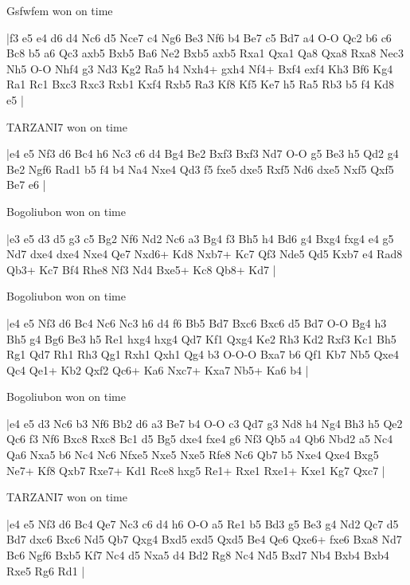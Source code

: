 \showboard

Gsfwfem won on time

\makegametitle
|f3 e5 e4 d6 d4 Nc6 d5 Nce7 c4 Ng6 Be3 Nf6 b4 Be7 c5 Bd7 a4 O-O Qc2 b6 c6 Bc8 b5 a6 Qc3 axb5 Bxb5 Ba6 Ne2 Bxb5 axb5 Rxa1 Qxa1 Qa8 Qxa8 Rxa8 Nec3 Nh5 O-O Nhf4 g3 Nd3 Kg2 Ra5 h4 Nxh4+ gxh4 Nf4+ Bxf4 exf4 Kh3 Bf6 Kg4 Ra1 Rc1 Bxc3 Rxc3 Rxb1 Kxf4 Rxb5 Ra3 Kf8 Kf5 Ke7 h5 Ra5 Rb3 b5 f4 Kd8 e5  |

\showboard

TARZANI7 won on time

\makegametitle
|e4 e5 Nf3 d6 Bc4 h6 Nc3 c6 d4 Bg4 Be2 Bxf3 Bxf3 Nd7 O-O g5 Be3 h5 Qd2 g4 Be2 Ngf6 Rad1 b5 f4 b4 Na4 Nxe4 Qd3 f5 fxe5 dxe5 Rxf5 Nd6 dxe5 Nxf5 Qxf5 Be7 e6  |

\showboard

Bogoliubon won on time

\makegametitle
|e3 e5 d3 d5 g3 c5 Bg2 Nf6 Nd2 Nc6 a3 Bg4 f3 Bh5 h4 Bd6 g4 Bxg4 fxg4 e4 g5 Nd7 dxe4 dxe4 Nxe4 Qe7 Nxd6+ Kd8 Nxb7+ Kc7 Qf3 Nde5 Qd5 Kxb7 e4 Rad8 Qb3+ Kc7 Bf4 Rhe8 Nf3 Nd4 Bxe5+ Kc8 Qb8+ Kd7  |

\showboard

Bogoliubon won on time

\makegametitle
|e4 e5 Nf3 d6 Bc4 Nc6 Nc3 h6 d4 f6 Bb5 Bd7 Bxc6 Bxc6 d5 Bd7 O-O Bg4 h3 Bh5 g4 Bg6 Be3 h5 Re1 hxg4 hxg4 Qd7 Kf1 Qxg4 Ke2 Rh3 Kd2 Rxf3 Kc1 Bh5 Rg1 Qd7 Rh1 Rh3 Qg1 Rxh1 Qxh1 Qg4 b3 O-O-O Bxa7 b6 Qf1 Kb7 Nb5 Qxe4 Qc4 Qe1+ Kb2 Qxf2 Qc6+ Ka6 Nxc7+ Kxa7 Nb5+ Ka6 b4  |

\showboard

Bogoliubon won on time

\makegametitle
|e4 e5 d3 Nc6 b3 Nf6 Bb2 d6 a3 Be7 b4 O-O c3 Qd7 g3 Nd8 h4 Ng4 Bh3 h5 Qe2 Qc6 f3 Nf6 Bxc8 Rxc8 Bc1 d5 Bg5 dxe4 fxe4 g6 Nf3 Qb5 a4 Qb6 Nbd2 a5 Nc4 Qa6 Nxa5 b6 Nc4 Nc6 Nfxe5 Nxe5 Nxe5 Rfe8 Nc6 Qb7 b5 Nxe4 Qxe4 Bxg5 Ne7+ Kf8 Qxb7 Rxe7+ Kd1 Rce8 hxg5 Re1+ Rxe1 Rxe1+ Kxe1 Kg7 Qxc7  |

\showboard

TARZANI7 won on time

\makegametitle
|e4 e5 Nf3 d6 Bc4 Qe7 Nc3 c6 d4 h6 O-O a5 Re1 b5 Bd3 g5 Be3 g4 Nd2 Qc7 d5 Bd7 dxc6 Bxc6 Nd5 Qb7 Qxg4 Bxd5 exd5 Qxd5 Be4 Qe6 Qxe6+ fxe6 Bxa8 Nd7 Bc6 Ngf6 Bxb5 Kf7 Nc4 d5 Nxa5 d4 Bd2 Rg8 Nc4 Nd5 Bxd7 Nb4 Bxb4 Bxb4 Rxe5 Rg6 Rd1  |

